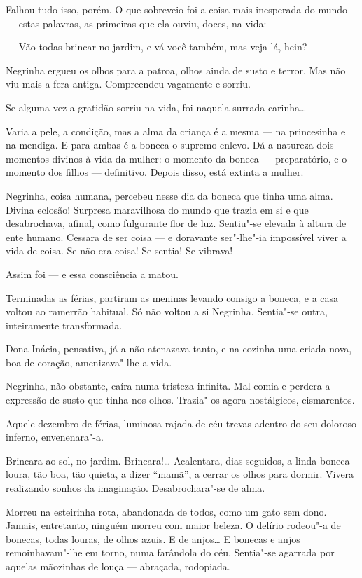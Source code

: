 Falhou tudo isso, porém. O que sobreveio foi a coisa mais inesperada do
mundo --- estas palavras, as primeiras que ela ouviu, doces, na vida:

--- Vão todas brincar no jardim, e vá você também, mas veja lá, hein?

Negrinha ergueu os olhos para a patroa, olhos ainda de susto e terror.
Mas não viu mais a fera antiga. Compreendeu vagamente e sorriu.

Se alguma vez a gratidão sorriu na vida, foi naquela surrada carinha\ldots{}

Varia a pele, a condição, mas a alma da criança é a mesma --- na
princesinha e na mendiga. E para ambas é a boneca o supremo enlevo. Dá a
natureza dois momentos divinos à vida da mulher: o momento da boneca ---
preparatório, e o momento dos filhos --- definitivo. Depois disso, está
extinta a mulher.

Negrinha, coisa humana, percebeu nesse dia da boneca que tinha uma alma.
Divina eclosão! Surpresa maravilhosa do mundo que trazia em si e que
desabrochava, afinal, como fulgurante flor de luz. Sentiu"-se elevada à
altura de ente humano. Cessara de ser coisa --- e doravante ser"-lhe"-ia
impossível viver a vida de coisa. Se não era coisa! Se sentia! Se
vibrava!

Assim foi --- e essa consciência a matou.

Terminadas as férias, partiram as meninas levando consigo a boneca, e a
casa voltou ao ramerrão habitual. Só não voltou a si Negrinha. Sentia"-se
outra, inteiramente transformada.

Dona Inácia, pensativa, já a não atenazava tanto, e na cozinha uma
criada nova, boa de coração, amenizava"-lhe a vida.

Negrinha, não obstante, caíra numa tristeza infinita. Mal comia e
perdera a expressão de susto que tinha nos olhos. Trazia"-os agora
nostálgicos, cismarentos.

Aquele dezembro de férias, luminosa rajada de céu trevas adentro do seu
doloroso inferno, envenenara"-a.

Brincara ao sol, no jardim. Brincara!\ldots{} Acalentara, dias seguidos, a
linda boneca loura, tão boa, tão quieta, a dizer ``mamã'', a cerrar os
olhos para dormir. Vivera realizando sonhos da imaginação.
Desabrochara"-se de alma.

Morreu na esteirinha rota, abandonada de todos, como um gato sem dono.
Jamais, entretanto, ninguém morreu com maior beleza. O delírio rodeou"-a
de bonecas, todas louras, de olhos azuis. E de anjos\ldots{} E bonecas e
anjos remoinhavam"-lhe em torno, numa farândola do céu. Sentia"-se
agarrada por aquelas mãozinhas de louça --- abraçada, rodopiada.

